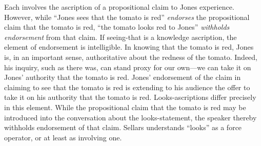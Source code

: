 \documentclass[11pt]{article}
\begin{document}
Each involves the ascription of a propositional claim to Jones experience. However, while ``Jones sees that the tomato is red'' \emph{endorses} the propositional claim that the tomato is red, ``the tomato looks red to Jones'' \emph{withholds endorsement} from that claim. If seeing-that is a knowledge ascription, the element of endorsement is intelligible. In knowing that the tomato is red, Jones is, in an important sense, authoritative about the redness of the tomato. Indeed, his inquiry, such as there was, can stand proxy for our own---we can take it on Jones' authority that the tomato is red. Jones' endorsement of the claim in claiming to see that the tomato is red is extending to his audience the offer to take it on his authority that the tomato is red. Looks-ascriptions differ precisely in this element. While the propositional claim that the tomato is red may be introduced into the conversation about the looks-statement, the speaker thereby withholds endorsement of that claim. Sellars understands ``looks'' as a force operator, or at least as involving one.
\end{document}
